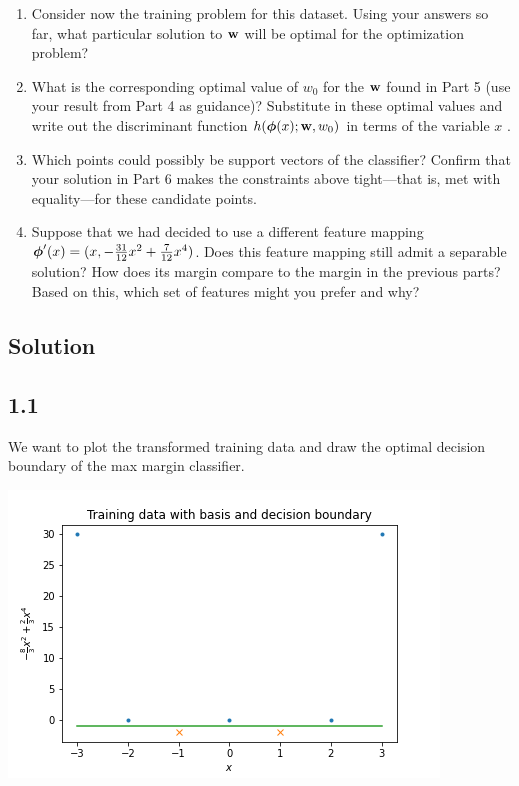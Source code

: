 \documentclass[submit]{harvardml}
\begin{document}
\begin{problem}
\begin{enumerate}
\item Consider now the training problem for this dataset. Using your
  answers so far, what particular solution to $\mathbf{w}$ will be optimal
  for the optimization problem?

\item What is the corresponding optimal value of $w_0$ for the
  $\mathbf{w}$ found in Part 5 (use your result from Part 4 as guidance)?
  Substitute in these optimal values and write out the discriminant
  function $h(\boldsymbol{\phi}(x);\mathbf{w},w_0)$ in terms of the variable $x$ .


\item Which points could possibly be support vectors of the classifier?  Confirm that
  your solution in Part 6 makes the constraints above tight---that is,
  met with equality---for these candidate points.

\item Suppose that we had decided to use a different feature mapping
    $\boldsymbol{\phi}'(x) = (x, -\frac{31}{12}x^2 + \frac{7}{12}x^4 )$.  Does
    this feature mapping still admit a separable solution?  How does
    its margin compare to the margin in the previous parts?  Based on
    this, which set of features might you prefer and why? 
    
\end{enumerate}

\end{problem}

\newpage
\subsection*{Solution}

\subsection*{1.1}

We want to plot the transformed training data and draw the optimal decision boundary of the max margin classifier.

\includegraphics{plots/1-1.png}
\end{document}
